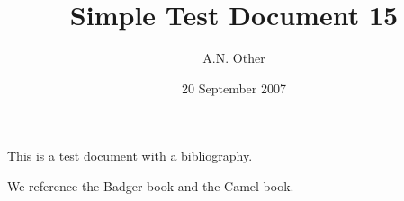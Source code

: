 \documentclass{article}
\date{20 September 2007}
\author{A.N. Other}
\title{Simple Test Document 15}
\begin{document}
\maketitle

This is a test document with a bibliography.

We reference the Badger book\cite{wardley-ptt-2003} and the Camel book\cite{wall-perl-2000}.


\end{document}
